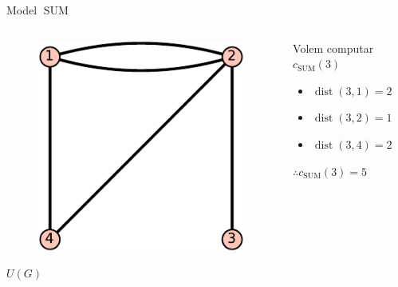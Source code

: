 \documentclass[aspectratio=169]{beamer}
\DeclareMathOperator{\dist}{dist}
\DeclareMathOperator{\SUM}{SUM}
\begin{document}
\begin{frame}{Model $\SUM$}
    \begin{columns}
        \begin{column}{0.5\textwidth}
        \centering
        \begin{figure}
        \includegraphics[scale=0.75]{u-crop}
        \end{figure}
        \vspace{-1em}
        {\large $U(G)$}
        \end{column}
        
        \begin{column}{0.5\textwidth}
        Volem computar $c_{\SUM}(3)$
        
        \vspace{1em}

        \begin{itemize}
            \item[] $\dist(3,1) = 2$ 
            \item[] $\dist(3,2) = 1$
            \item[] $\dist(3,4) = 2$ 
        \end{itemize}
        
        \vspace{1em}
        
        $\therefore c_{\SUM}(3) = 5$
        \end{column}
    \end{columns}
\end{frame}
\end{document}
